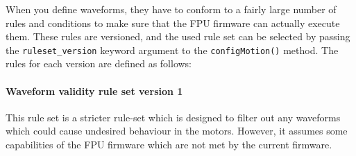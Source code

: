 \documentclass[11pt,a4paper]{scrartcl}
\begin{document}
When you define waveforms, they have to conform to a fairly large
number of rules and conditions to make sure that the FPU firmware can
actually execute them. These rules are versioned, and the used rule
set can be selected by passing the \texttt{ruleset\_version} keyword
argument to the \texttt{configMotion()} method.  The rules for each
version are defined as follows:

\paragraph{Waveform validity rule set version 1}

This rule set is a stricter rule-set which is designed to filter out
any waveforms which could cause undesired behaviour in the motors.
However, it assumes some capabilities of the FPU firmware which are
not met by the current firmware.
\end{document}
